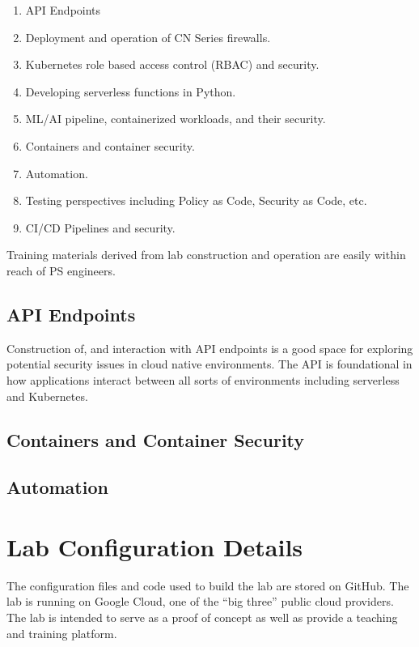 \begin{raggedright}
	\begin{enumerate}
		\item API Endpoints
		\item Deployment and operation of CN Series firewalls.
		\item Kubernetes role based access control (RBAC) and security.
		\item Developing serverless functions in Python.
		\item ML/AI pipeline, containerized workloads, and their security.
		\item Containers and container security.
		\item Automation.
		\item Testing perspectives including Policy as Code, Security as Code, etc.
		\item CI/CD Pipelines and security.
	\end{enumerate}
\end{raggedright}
\vspace{2mm}

\justifying
Training materials derived from lab construction and operation are easily within reach of PS engineers.

\subsection{\label{sec:apis}API Endpoints}

Construction of, and interaction with API endpoints is a good space for exploring potential security issues in
cloud native environments. The API is foundational in how applications interact between all sorts of environments
including serverless and Kubernetes.

\subsection{\label{sec:contsec}Containers and Container Security}

\subsection{\label{sec:auto}Automation}

\section{\label{sec:Lab}Lab Configuration Details}
\vspace{2mm}
\justifying
The configuration files and code used to build the lab are stored on GitHub. The lab is running on Google Cloud, one of the ``big three'' public cloud providers.
The lab is intended to serve as a proof of concept as well as provide a teaching and training platform.

